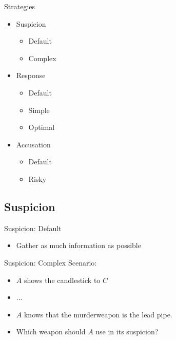 
\begin{frame}{Strategies}
  \begin{itemize}
    \item Suspicion
    \begin{itemize}
     \item Default
     \item Complex
    \end{itemize}

    \item Response
    \begin{itemize}
     \item Default
     \item Simple
     \item Optimal
    \end{itemize}

    \item Accusation
    \begin{itemize}
     \item Default
     \item Risky
    \end{itemize}

  \end{itemize}
\end{frame}


\subsection{Suspicion}



\begin{frame}{Suspicion: Default}
  \begin{itemize}
   \item Gather as much information as possible
  \end{itemize}
\end{frame}

\begin{frame}{Suspicion: Complex}
  Scenario: 
  \begin{itemize}
    \item $A$ shows the candlestick to $C$ 
    \item ...
    \item $A$ knows that the murderweapon is the lead pipe.
    \item Which weapon should $A$ use in its suspicion?
  \end{itemize}
\end{frame}

